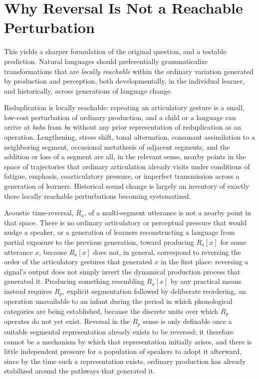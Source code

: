 \documentclass[11pt]{article}
\begin{document}
\section{Why Reversal Is Not a Reachable Perturbation}

This yields a sharper formulation of the original question, and a testable prediction. Natural languages should preferentially grammaticalize transformations that are \emph{locally reachable} within the ordinary variation generated by production and perception, both developmentally, in the individual learner, and historically, across generations of language change.

Reduplication is locally reachable: repeating an articulatory gesture is a small, low-cost perturbation of ordinary production, and a child or a language can arrive at \emph{baba} from \emph{ba} without any prior representation of reduplication as an operation. Lengthening, stress shift, tonal alternation, consonant assimilation to a neighboring segment, occasional metathesis of adjacent segments, and the addition or loss of a segment are all, in the relevant sense, nearby points in the space of trajectories that ordinary articulation already visits under conditions of fatigue, emphasis, coarticulatory pressure, or imperfect transmission across a generation of learners. Historical sound change is largely an inventory of exactly these locally reachable perturbations becoming systematized.

Acoustic time-reversal, $R_a$, of a multi-segment utterance is not a nearby point in that space. There is no ordinary articulatory or perceptual pressure that would nudge a speaker, or a generation of learners reconstructing a language from partial exposure to the previous generation, toward producing $R_a[x]$ for some utterance $x$, because $R_a[x]$ does not, in general, correspond to reversing the order of the articulatory gestures that generated $x$ in the first place: reversing a signal's output does not simply invert the dynamical production process that generated it. Producing something resembling $R_a[x]$ by any practical means instead requires $R_p$, explicit segmentation followed by deliberate reordering, an operation unavailable to an infant during the period in which phonological categories are being established, because the discrete units over which $R_p$ operates do not yet exist. Reversal in the $R_p$ sense is only definable once a suitable segmental representation already exists to be reversed; it therefore cannot be a mechanism by which that representation initially arises, and there is little independent pressure for a population of speakers to adopt it afterward, since by the time such a representation exists, ordinary production has already stabilized around the pathways that generated it.
\end{document}
